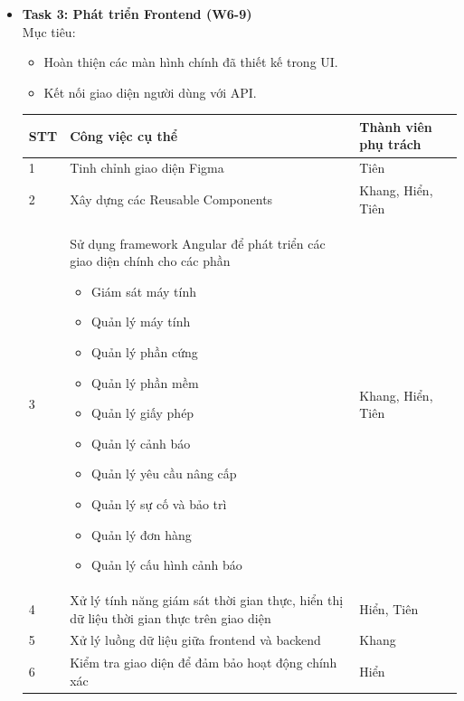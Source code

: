 \begin{itemize}
\item\textbf{Task 3: Phát triển Frontend (W6-9)}\\
\indent Mục tiêu:
\begin{itemize}
    \item Hoàn thiện các màn hình chính đã thiết kế trong UI.
    \item Kết nối giao diện người dùng với API.
\end{itemize}
\begin{table}[H]
    \centering
    \begin{tabular}{|p{1cm}|p{8cm}|p{4cm}|}
        \hline
        \textbf{STT} & \textbf{Công việc cụ thể} & \textbf{Thành viên phụ trách} \\
        \hline
        1 & Tinh chỉnh giao diện Figma & Tiên \\
        \hline
        2 & Xây dựng các Reusable Components & Khang, Hiển, Tiên \\
        \hline
        3 & Sử dụng framework Angular để phát triển các giao diện chính cho các phần 
        \begin{itemize}
            \item Giám sát máy tính
            \item Quản lý máy tính
            \item Quản lý phần cứng
            \item Quản lý phần mềm
            \item Quản lý giấy phép
            \item Quản lý cảnh báo
            \item Quản lý yêu cầu nâng cấp
            \item Quản lý sự cố và bảo trì
            \item Quản lý đơn hàng
            \item Quản lý cấu hình cảnh báo
        \end{itemize} & Khang, Hiển, Tiên \\
        \hline
        4 & Xử lý tính năng giám sát thời gian thực, hiển thị dữ liệu thời gian thực trên giao diện &  Hiển, Tiên \\
        \hline
        5 & Xử lý luồng dữ liệu giữa frontend và backend & Khang \\
        \hline
        6 & Kiểm tra giao diện để đảm bảo hoạt động chính xác & Hiển\\
        \hline
    \end{tabular}
\end{table}


\end{itemize}
